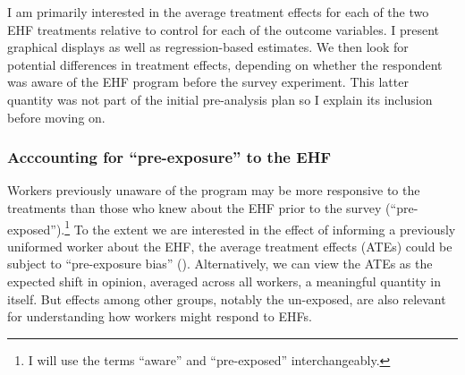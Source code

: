 \documentclass[
  11pt,
  oneside]{article}
\begin{document}
I am primarily interested in the average treatment effects for each of the two EHF treatments relative to control for each of the outcome variables. I present graphical displays as well as regression-based estimates. We then look for potential differences in treatment effects, depending on whether the respondent was aware of the EHF program before the survey experiment. This latter quantity was not part of the initial pre-analysis plan so I explain its inclusion before moving on.

\subsubsection{Acccounting for ``pre-exposure'' to the EHF}\label{acccounting-for-pre-exposure-to-the-ehf}

Workers previously unaware of the program may be more responsive to the treatments than those who knew about the EHF prior to the survey (``pre-exposed'').\footnote{I will use the terms ``aware'' and ``pre-exposed'' interchangeably.} To the extent we are interested in the effect of informing a previously uniformed worker about the EHF, the average treatment effects (ATEs) could be subject to ``pre-exposure bias'' (). Alternatively, we can view the ATEs as the expected shift in opinion, averaged across all workers, a meaningful quantity in itself. But effects among other groups, notably the un-exposed, are also relevant for understanding how workers might respond to EHFs.
\end{document}
